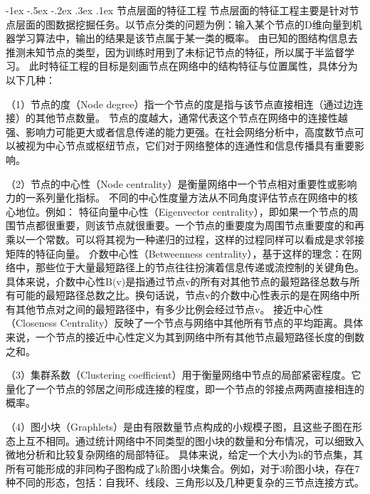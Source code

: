 \documentclass[12pt, a4paper]{article}
\makeatletter
\newcommand*{\hei}{\CJKfamily{zhhei}}
\newcommand{\xiaosihao}{\fontsize{12pt}{\baselineskip}\selectfont}
\renewcommand\subsubsection{\@startsection{subsubsection}{1}{\z@}%
{-1ex \@plus -.5ex \@minus -.2ex}%
{.3ex \@plus .1ex}%
{\normalfont\xiaosihao\hei}}
\makeatother
\begin{document}
\subsubsection{节点层面的特征工程}
节点层面的特征工程主要是针对节点层面的图数据挖掘任务。以节点分类的问题为例：输入某个节点的D维向量到机器学习算法中，输出的结果是该节点属于某一类的概率。
由已知的图结构信息去推测未知节点的类型，因为训练时用到了未标记节点的特征，所以属于半监督学习。
此时特征工程的目标是刻画节点在网络中的结构特征与位置属性，具体分为以下几种：
\par
（1）节点的度（Node degree）指一个节点的度是指与该节点直接相连（通过边连接）的其他节点数量。
节点的度越大，通常代表这个节点在网络中的连接性越强、影响力可能更大或者信息传递的能力更强。在社会网络分析中，高度数节点可以被视为中心节点或枢纽节点，它们对于网络整体的连通性和信息传播具有重要影响。
\par
（2）节点的中心性（Node centrality）是衡量网络中一个节点相对重要性或影响力的一系列量化指标。
不同的中心性度量方法从不同角度评估节点在网络中的核心地位。例如：
特征向量中心性（Eigenvector centrality），即如果一个节点的周围节点都很重要，则该节点就很重要。一个节点的重要度为周围节点重要度的和再乘以一个常数。可以将其视为一种递归的过程，这样的过程同样可以看成是求邻接矩阵的特征向量。
介数中心性（Betweenness centrality），基于这样的理念：在网络中，那些位于大量最短路径上的节点往往扮演着信息传递或流控制的关键角色。具体来说，介数中心性B(v)是指通过节点v的所有对其他节点的最短路径总数与所有可能的最短路径总数之比。换句话说，节点v的介数中心性表示的是在网络中所有其他节点对之间的最短路径中，有多少比例会经过节点v。
接近中心性（Closeness Centrality）反映了一个节点与网络中其他所有节点的平均距离。具体来说，一个节点的接近中心性定义为其到网络中所有其他节点最短路径长度的倒数之和。
\par
（3）集群系数（Clustering coefficient）用于衡量网络中节点的局部紧密程度。它量化了一个节点的邻居之间形成连接的程度，即一个节点的邻接点两两直接相连的概率。
\par
（4）图小块（Graphlets）是由有限数量节点构成的小规模子图，且这些子图在形态上互不相同。通过统计网络中不同类型的图小块的数量和分布情况，可以细致入微地分析和比较复杂网络的局部特征。
具体来说，给定一个大小为k的节点集，其所有可能形成的非同构子图构成了k阶图小块集合。例如，对于3阶图小块，存在7种不同的形态，包括：自我环、线段、三角形以及几种更复杂的三节点连接方式。
\par
\end{document}
